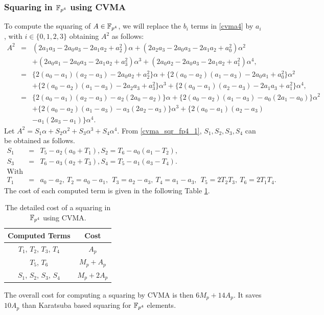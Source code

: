 \subsubsection{Squaring in \texorpdfstring{$\mathbb{F}_{p^4}$}{} using CVMA}
To compute the squaring of $A \in \mathbb{F}_{p^4}$, we will replace the $b_i$ terms in \eqref{cvma4} by $a_i$, with $i \in \{0, 1, 2, 3\}$ obtaining $A^2$ as follows:
\begin{eqnarray}
A^2&=&(2a_1a_3-2a_0a_3-2a_1a_2+a_2^2)\alpha\nonumber
+(2a_2a_3-2a_0a_3-2a_1a_2+a_0^2)\alpha^2\nonumber\\
&&+(2a_0a_1-2a_0a_3-2a_1a_2+a_3^2)\alpha^3\nonumber
+(2a_0a_2-2a_0a_3-2a_1a_2+a_1^2)\alpha^4\nonumber,\\
&=&\{2(a_0-a_1)(a_2-a_3)-2a_0a_2+a_2^2\}\alpha\nonumber
+\{2(a_0-a_2)(a_1-a_3)-2a_0a_1+a_0^2\}\alpha^2\nonumber\\
&&+\{2(a_0-a_2)(a_1-a_3)-2a_2a_3+a_3^2\}\alpha^3\nonumber
+\{2(a_0-a_1)(a_2-a_3)-2a_1a_3+a_1^2\}\alpha^4\nonumber,\\
&=&\{2(a_0-a_1)(a_2-a_3)-a_2(2a_0-a_2)\}\alpha\nonumber 
+\{2(a_0-a_2)(a_1-a_3)-a_0(2a_1-a_0)\}\alpha^2\nonumber\\
&&+\{2(a_0-a_2)(a_1-a_3)-a_3(2a_2-a_3)\}\alpha^3
+\{2(a_0-a_1)(a_2-a_3)\nonumber\\
&&-a_1(2a_3-a_1)\}\alpha^4\label{cvma_sqr_fp4_1}.
\end{eqnarray}
Let $A^2=S_1\alpha+S_2\alpha^2+S_3\alpha^3+S_4\alpha^4$. 
From \eqref{cvma_sqr_fp4_1}, $S_1,S_2,S_3,S_4$ can be obtained as follows.
\begin{eqnarray*}
S_1&=&T_5-a_2(a_0+T_1),S_2=T_6-a_0(a_1-T_2),\\
S_3&=&T_6-a_3(a_2+T_3),S_4=T_5-a_1(a_3-T_4).\\
\text{With}\\
T_1&=&a_0-a_2,\ T_2=a_0-a_1,\ \ T_3=a_2-a_3,\ T_4=a_1-a_3,\ \ T_5=2T_2T_3,\  T_6=2T_1T_4.
\end{eqnarray*}
The cost of each computed term is given in the following Table \ref{tab_cvma_sqr_cost_computedterms}.
\renewcommand{\baselinestretch}{1.2}
\begin{table}[ht]
	\centering
	\caption{The detailed cost of a squaring in $\mathbb{F}_{p^4}$ using CVMA.}
	\label{tab_cvma_sqr_cost_computedterms}
	\begin{tabular}{|c|c|}
		\hline
		 Computed  Terms & Cost       \\ 
		 \hline
		$T_1$, $T_2$, $T_3$, $T_4$   & $ A_p$    \\ \hline
		$T_5$, $T_6$            &  $ M_p+A_p$     \\ \hline
		$S_1$, $S_2$, $S_3$, $S_4$ & $ M_p+2A_p$\\ \hline
	\end{tabular}
\end{table}
\renewcommand{\baselinestretch}{1.0}
The overall cost for computing a squaring by CVMA is then $6M_p+14A_p$. It saves $10A_p$ than Karatsuba based squaring for $\mathbb{F}_{p^4}$ elements.

